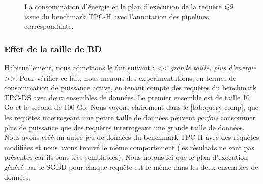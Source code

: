 \begin{figure}[!ht]
  \centering
  \quad
  \caption{La consommation d'énergie et le plan d'exécution de la requête \textit{Q9} issue du benchmark TPC-H avec l'annotation des pipelines correspondante.}\label{fig:tpch10-set1-q9}
\end{figure}

\subsubsection{Effet de la taille de BD}
Habituellement, nous admettons le fait suivant : \textit{<< grande taille, plus d'énergie >>}. Pour vérifier ce fait, nous menons des expérimentations, en termes de consommation de puissance active, en tenant compte des requêtes du benchmark TPC-DS \cite{TPCDS} avec deux ensembles de données. Le premier ensemble est de taille 10 Go et le second de 100 Go.
Nous voyons clairement dans le \ref{tab:query-comp}, que les requêtes interrogeant une petite taille de données peuvent  \textit{parfois} consommer plus de puissance que des requêtes interrogeant une grande taille de données. Nous avons créé un autre jeu de données du benchmark TPC-H avec des requêtes modifiées et nous avons trouvé le même comportement (les résultats ne sont pas présentés car ils sont très semblables). Nous notons ici que le plan d'exécution généré par le SGBD pour chaque requête est le même dans les deux ensembles de données.

